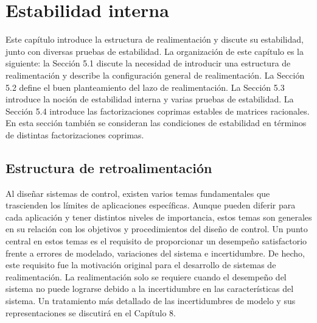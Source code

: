 \chapter{Estabilidad interna}
Este capítulo introduce la estructura de realimentación y discute su estabilidad, junto con diversas pruebas de estabilidad. La organización de este capítulo es la siguiente: la Sección 5.1 discute la necesidad de introducir una estructura de realimentación y describe la configuración general de realimentación. La Sección 5.2 define el buen planteamiento del lazo de realimentación. La Sección 5.3 introduce la noción de estabilidad interna y varias pruebas de estabilidad. La Sección 5.4 introduce las factorizaciones coprimas estables de matrices racionales. En esta sección también se consideran las condiciones de estabilidad en términos de distintas factorizaciones coprimas.

\section{Estructura de retroalimentación}
Al diseñar sistemas de control, existen varios temas fundamentales que trascienden los límites de aplicaciones específicas. Aunque pueden diferir para cada aplicación y tener distintos niveles de importancia, estos temas son generales en su relación con los objetivos y procedimientos del diseño de control. Un punto central en estos temas es el requisito de proporcionar un desempeño satisfactorio frente a errores de modelado, variaciones del sistema e incertidumbre. De hecho, este requisito fue la motivación original para el desarrollo de sistemas de realimentación. La realimentación solo se requiere cuando el desempeño del sistema no puede lograrse debido a la incertidumbre en las características del sistema. Un tratamiento más detallado de las incertidumbres de modelo y sus representaciones se discutirá en el Capítulo 8.

